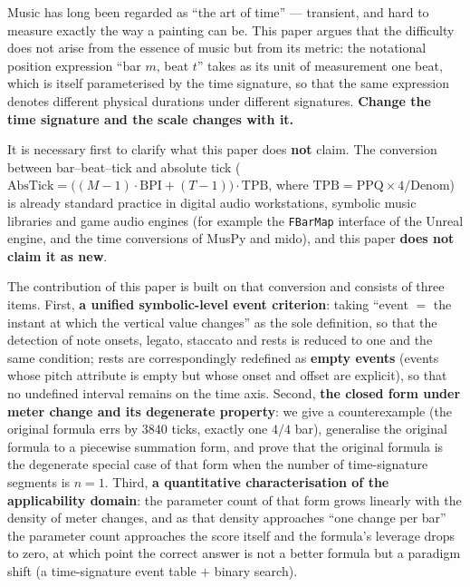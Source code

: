 \documentclass[11pt,a4paper]{article}
\begin{document}
\vspace{0.4em}
\begin{abstracten}

Music has long been regarded as ``the art of time'' --- transient, and hard to
measure exactly the way a painting can be. This paper argues that the difficulty
does not arise from the essence of music but from its metric: the notational
position expression ``bar $m$, beat $t$'' takes as its unit of measurement one
beat, which is itself parameterised by the time signature, so that the same
expression denotes different physical durations under different signatures.
\textbf{Change the time signature and the scale changes with it.}

It is necessary first to clarify what this paper does \textbf{not} claim. The
conversion between bar--beat--tick and absolute tick
($\mathrm{AbsTick}=\bigl((M-1)\cdot\mathrm{BPI}+(T-1)\bigr)\cdot\mathrm{TPB}$,
where $\mathrm{TPB}=\mathrm{PPQ}\times4/\mathrm{Denom}$) is already standard
practice in digital audio workstations, symbolic music libraries and game audio
engines (for example the \texttt{FBarMap} interface of the Unreal engine, and the
time conversions of MusPy and mido), and this paper \textbf{does not claim it as
new}.

The contribution of this paper is built on that conversion and consists of three
items. First, \textbf{a unified symbolic-level event criterion}: taking ``event
$=$ the instant at which the vertical value changes'' as the sole definition, so
that the detection of note onsets, legato, staccato and rests is reduced to one
and the same condition; rests are correspondingly redefined as \textbf{empty
events} (events whose pitch attribute is empty but whose onset and offset are
explicit), so that no undefined interval remains on the time axis. Second,
\textbf{the closed form under meter change and its degenerate property}: we give
a counterexample (the original formula errs by $3840$ ticks, exactly one $4/4$
bar), generalise the original formula to a piecewise summation form, and prove
that the original formula is the degenerate special case of that form when the
number of time-signature segments is $n=1$. Third, \textbf{a quantitative
characterisation of the applicability domain}: the parameter count of that form
grows linearly with the density of meter changes, and as that density approaches
``one change per bar'' the parameter count approaches the score itself and the
formula's leverage drops to zero, at which point the correct answer is not a
better formula but a paradigm shift (a time-signature event table $+$ binary
search).


\end{abstracten}
\end{document}
